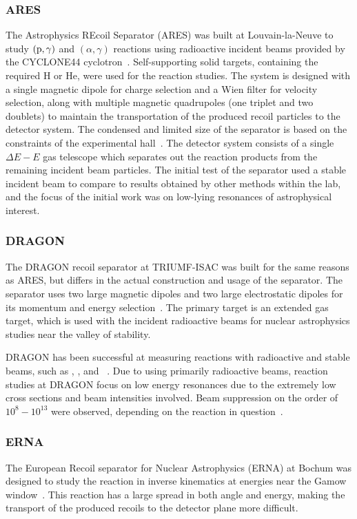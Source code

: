 \subsubsection{ARES}
The Astrophysics REcoil Separator (ARES) was built at Louvain-la-Neuve
to study $(\rm{p},\gamma)$ and $(\alpha,\gamma)$ reactions using
radioactive incident beams provided by the CYCLONE44
cyclotron~\cite{Angulo2001}. Self-supporting solid targets, containing
the required H or He, were used for the reaction studies. The system is
designed with a single magnetic dipole for charge selection and a Wien
filter for velocity selection, along with multiple magnetic quadrupoles
(one triplet and two doublets) to maintain the transportation of the
produced recoil particles to the detector system. The condensed and
limited size of the separator is based on the constraints of the
experimental hall~\cite{Couder2003}. The detector system consists of a
single $\Delta E - E$ gas telescope which separates out the reaction
products from the remaining incident beam particles. The initial test of
the separator used a stable incident beam to compare to results obtained
by other methods within the lab, and the focus of the initial work was
on low-lying resonances of astrophysical interest.

\subsubsection{DRAGON}
The DRAGON recoil separator at TRIUMF-ISAC was built for the same
reasons as ARES, but differs in the actual construction and usage of the
separator. The separator uses two large magnetic dipoles and two large
electrostatic dipoles for its momentum and energy
selection~\cite{Engel2005}. The primary target is an extended gas
target, which is used with the incident radioactive beams for nuclear
astrophysics studies near the valley of stability.

DRAGON has been successful at measuring reactions with radioactive and
stable beams, such as
,
, and
~\cite{Engel2005}.
Due to using primarily radioactive beams, reaction studies at DRAGON
focus on low energy resonances due to the extremely low cross sections
and beam intensities involved. Beam suppression on the order of $10^{8}
- 10^{13}$ were observed, depending on the reaction in
question~\cite{Engel2005}.

\subsubsection{ERNA}
The European Recoil separator for Nuclear Astrophysics (ERNA) at Bochum
was designed to study the
 reaction in inverse
kinematics at energies near the Gamow window~\cite{Rogalla2003}. This
reaction has a large spread in both angle and energy, making the
transport of the produced recoils to the detector plane more difficult.

